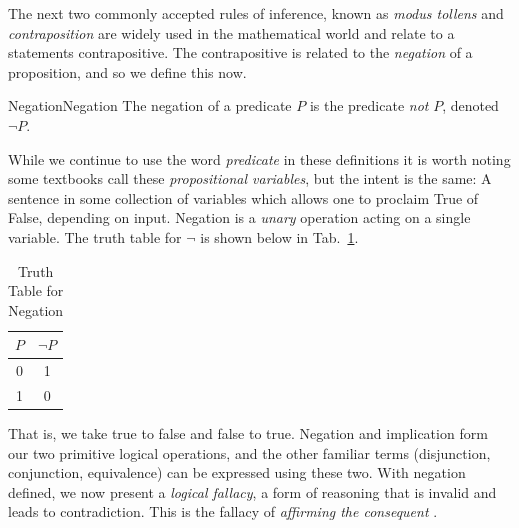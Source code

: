         The next two commonly accepted rules of inference, known as
        \textit{modus tollens} and
        \textit{contraposition} are widely used
        in the mathematical world and relate to a statements contrapositive.
        The contrapositive is related to the \textit{negation} of a proposition,
        and so we define this now.
        \begin{fdefinition}{Negation}{Negation}
            The negation of a \gls{predicate} $P$ is the predicate \textit{not}
            $P$, denoted $\neg{P}$.
        \end{fdefinition}
        While we continue to use the word \textit{predicate} in these
        definitions it is worth noting some textbooks call these
        \textit{propositional variables}, but the
        intent is the same: A sentence in some collection of variables which
        allows one to proclaim True of False, depending on input. Negation is a
        \textit{unary} operation acting on a single variable. The truth table
        for $\neg$ is shown below in Tab.~\ref{tab:Truth_Table_Negation}.
        \begin{table}[H]
            \centering
            \captionsetup{type=table}
            \begin{tabular}{c|c}
                $P$&$\neg{P}$\\
                \hline
                0&1\\
                1&0
            \end{tabular}
            \caption{Truth Table for Negation}
            \label{tab:Truth_Table_Negation}
        \end{table}
        That is, we take true to false and false to true. Negation and
        implication form our two primitive logical operations, and the other
        familiar terms (disjunction, conjunction, equivalence) can be expressed
        using these two. With negation defined, we now present a
        \textit{logical fallacy}, a form of reasoning
        that is invalid and leads to contradiction. This is the fallacy of
        \textit{affirming the consequent}%
        .
